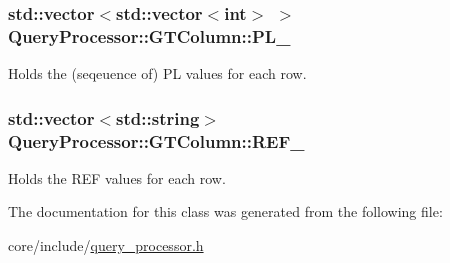 \subsubsection[{P\+L\+\_\+}]{\setlength{\rightskip}{0pt plus 5cm}std\+::vector$<$std\+::vector$<$int$>$ $>$ Query\+Processor\+::\+G\+T\+Column\+::\+P\+L\+\_\+}\label{classQueryProcessor_1_1GTColumn_ae8ec6b1697723684e1c11a62cc4af5c9}
Holds the (seqeuence of) P\+L values for each row. \hypertarget{classQueryProcessor_1_1GTColumn_a368367e65449a63d93b96a800dc2ddc3}{}
\subsubsection[{R\+E\+F\+\_\+}]{\setlength{\rightskip}{0pt plus 5cm}std\+::vector$<$std\+::string$>$ Query\+Processor\+::\+G\+T\+Column\+::\+R\+E\+F\+\_\+}\label{classQueryProcessor_1_1GTColumn_a368367e65449a63d93b96a800dc2ddc3}
Holds the R\+E\+F values for each row. 

The documentation for this class was generated from the following file\+:\begin{DoxyCompactItemize}
\item 
core/include/\hyperlink{query__processor_8h}{query\+\_\+processor.\+h}\end{DoxyCompactItemize}
